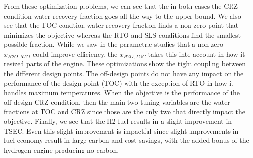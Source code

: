 \documentclass[12pt]{new-aiaa}
\begin{document}
\noindent
From these optimization problems, we can see that the in both cases the CRZ condition water recovery fraction goes all the way to the upper bound.
We also see that the TOC condtion water recovery fraction finds a non-zero point that minimizes the objective whereas the RTO and SLS conditions find the smallest possible fraction.
While we saw in the parametric studies that a non-zero $x_{H2O,RTO}$ could improve efficiency, the $x_{H2O,TOC}$ takes this into account in how it resized parts of the engine.
These optimizations show the tight coupling between the different design points.
The off-design points do not have any impact on the performance of the design point (TOC) with the exception of RTO in how it handles maximum temperatures.
When the objective is the performance of the off-design CRZ condition, then the main two tuning variables are the water fractions at TOC and CRZ since those are the only two that directly impact the objective.
Finally, we see that the H2 fuel results in a slight improvement in TSEC.
Even this slight improvement is impactful since slight improvements in fuel economy result in large carbon and cost savings, with the added bonus of the hydrogen engine producing no carbon.
\end{document}
